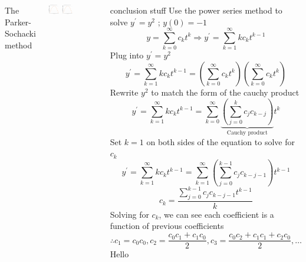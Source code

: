 \documentclass[25pt, a0paper, portrait]{tikzposter}
\begin{document}
\begin{columns}
    {
        The Parker-Sochacki method 
    }  
    {
        \begin{tikzfigure}
        \includegraphics[width=0.22\textwidth]{images/PSM5 TS1 Plot.png}
        \hspace*{1.3cm}
        \includegraphics[width=0.22\textwidth]{images/PSM5 TS1 Plot.png}    
        \end{tikzfigure}
    }
    {
        conclusion stuff
    }
    {
        Use the power series method to solve $y^\prime = y^2$ ; $y(0) = -1$
        \begin{equation*}
            y = \sum\limits_{k=0}^{\infty}c_kt^k \Rightarrow y^\prime = \sum\limits_{k=1}^{\infty}kc_kt^{k-1}
        \end{equation*}
        Plug into $y^\prime = y^2$
        \begin{equation*}
            y^\prime = \sum\limits_{k=1}^{\infty}kc_kt^{k-1} = \left(\sum\limits_{k=0}^{\infty}c_kt^k\right) \left(\sum\limits_{k=0}^{\infty}c_kt^k\right)
        \end{equation*}
        Rewrite $y^2$ to match the form of the cauchy product
        \begin{equation}
            y^\prime = \sum\limits_{k=1}^{\infty}kc_kt^{k-1} = \sum\limits_{k=0}^{\infty} \underbrace{\left(\sum\limits_{j=0}^{k}c_jc_{k-j}\right)}_{\text{Cauchy product}}t^k
        \end{equation}
        Set $k = 1$ on both sides of the equation to solve for $c_k$
        \begin{equation*}
            y^\prime = \sum\limits_{k=1}^{\infty}kc_kt^{k-1} = \sum\limits_{k=1}^{\infty} \left(\sum\limits_{j=0}^{k-1}c_jc_{k-j-1}\right)t^{k-1}
        \end{equation*}
        \begin{equation}
            c_k = \frac{\sum\limits_{j=0}^{k-1}c_jc_{k-j-1}t^{k-1}}{k}
        \end{equation}
        Solving for $c_k$, we can see each coefficient is a function of previous coefficients
        \begin{equation*}
            \therefore c_1 = c_0c_0, c_2 = \frac{c_0c_1 + c_1c_0}{2}, c_3 = \frac{c_0c_2 + c_1c_1+ c_2c_0}{2},\dots
        \end{equation*}
    }
    {
        Hello
    }
\end{columns}
\end{document}
